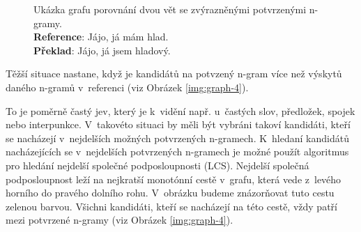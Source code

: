 \begin{figure}[h!]
	\centering

	\caption{
		Ukázka grafu porovnání dvou vět se zvýrazněnými potvrzenými \mbox{n-gramy}. \\
		\textbf{Reference}: Jájo, já mám hlad. \\
		\textbf{Překlad}: Jájo, já jsem hladový.
	}
	\label{img:graph-2}
\end{figure}

Těžší situace nastane,
  když je kandidátů na potvzený \mbox{n-gram} více než výskytů daného \mbox{n-gramů} v~referenci (viz Obrázek \ref{img:graph-4}).

To je poměrně častý jev,
  který je k~vidění např. u~častých slov, předložek, spojek nebo interpunkce.
V~takovéto situaci by měli být vybráni takoví kandidáti,
  kteří se nacházejí v~nejdelších možných potvrzených \mbox{n-gramech}.
K~hledaní kandidátů nacházejících se v~nejdelších potvrzených \mbox{n-gramech} je možné použít algoritmus pro hledání nejdelší společné podposloupnosti (LCS).
Nejdelší společná podposloupnost leží na nejkratší monotónní cestě v~grafu,
  která vede z~levého horního do pravého dolního rohu.
V~obrázku budeme znázorňovat tuto cestu zelenou barvou.
Všichni kandidáti, kteří se nacházejí na této cestě,
  vždy patří mezi potvrzené \mbox{n-gramy} (viz Obrázek \ref{img:graph-4}).

